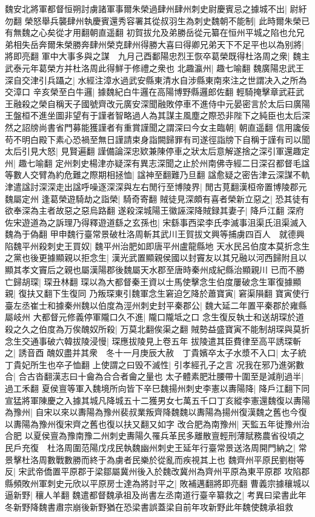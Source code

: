 魏安北將軍都督恒朔討虜諸軍事爾朱榮過肆州肆州刺史尉慶賓忌之據城不出|{
	尉紆勿翻}
榮怒舉兵襲肆州執慶賓還秀容署其從叔羽生為刺史魏朝不能制|{
	此時爾朱榮已有無魏之心矣從才用翻朝直遥翻}
初賀拔允及弟勝岳從元纂在恒州平城之陷也允兄弟相失岳奔爾朱榮勝奔肆州榮克肆州得勝大喜曰得卿兄弟天下不足平也以為别將|{
	將即亮翻}
軍中大事多與之謀　九月己酉鄱陽忠烈王恢卒葛榮既得杜洛周之衆|{
	魏主武泰元年葛榮方并杜洛周此得鮮于修禮之衆也}
北趣瀛州|{
	趣七喻翻}
魏廣陽忠武王深自交津引兵躡之|{
	水經注漳水過武安縣東清水自涉縣東南來注之世謂决入之所為交漳口}
辛亥榮至白牛邏|{
	據魏紀白牛邏在高陽博野縣邏郎佐翻}
輕騎掩擊章武莊武王融殺之榮自稱天子國號齊改元廣安深聞融敗停車不進侍中元晏密言於太后曰廣陽王盤桓不進坐圖非望有于謹者智略過人為其謀主風塵之際恐非陛下之純臣也太后深然之詔牓尚書省門募能獲謹者有重賞謹聞之謂深曰今女主臨朝|{
	朝直遥翻}
信用讒佞苟不明白殿下素心恐禍至無日謹請束身詣闕歸罪有司遂徑詣牓下自稱于謹有司以聞太后引見大怒|{
	見賢遍翻}
謹備論深忠欵兼陳停車之狀太后意解遂捨之深引軍還趣定州|{
	趣七喻翻}
定州刺史楊津亦疑深有異志深聞之止於州南佛寺經二日深召都督毛諡等數人交臂為約危難之際期相拯恤|{
	諡神至翻難乃旦翻}
諡愈疑之密告津云深謀不軌津遣諡討深深走出諡呼噪逐深深與左右閒行至博陵界|{
	閒古莧翻漢桓帝置博陵郡元魏屬定州}
逢葛榮遊騎劫之詣榮|{
	騎奇寄翻}
賊徒見深頗有喜者榮新立惡之|{
	恐其徒有欲奉深為主者故惡之惡烏路翻}
遂殺深城陽王徽誣深降賊録其妻子|{
	降戶江翻}
深府佐宋遊道為之訴理乃得釋遊道繇之玄孫也|{
	宋繇事西梁李氏李滅事沮渠氏沮渠滅入魏為于偽翻}
甲申魏行臺常景破杜洛周斬其武川王賀拔文興等捕虜四百人　就德興陷魏平州殺刺史王買奴|{
	魏平州治肥如即唐平州盧龍縣地}
天水民呂伯度本莫折念生之黨也後更據顯親以拒念生|{
	漢光武置顯親侯國以封竇友以其兄融以河西歸附且以顯其孝文竇后之親也屬漢陽郡後魏屬天水郡至唐時秦州成紀縣治顯親川}
已而不勝亡歸胡琛|{
	琛丑林翻}
琛以為大都督秦王資以士馬使擊念生伯度屢破念生軍復據顯親|{
	復扶又翻下生復同}
乃叛琛東引魏軍念生窘迫乞降於蕭寶寅|{
	窘渠隕翻}
寶寅使行臺左丞崔士和據秦州魏以伯度為涇州刺史封平秦郡公|{
	魏大延二年置平秦郡於雍縣屬岐州}
大都督元修義停軍隴口久不進|{
	隴口隴坻之口}
念生復反執士和送胡琛於道殺之久之伯度為万俟醜奴所殺|{
	万莫北翻俟渠之翻}
賊勢益盛寶寅不能制胡琛與莫折念生交通事破六韓拔陵浸慢|{
	琛應拔陵見上卷五年}
拔陵遣其臣費律至高平誘琛斬之|{
	誘音酉}
醜奴盡并其衆　冬十一月庚辰大赦　丁貴嬪卒太子水漿不入口|{
	太子統丁貴妃所生也卒子恤翻}
上使謂之曰毁不滅性|{
	引孝經孔子之言}
况我在邪乃進粥數合|{
	合古沓翻漢志曰十龠為合合者龠之量也}
太子體素肥壯腰帶十圍至是減削過半|{
	過工禾翻}
夏侯亶等軍入魏境所向皆下辛巳魏揚州刺史李憲以夀陽降|{
	降戶江翻下同}
宣猛將軍陳慶之入據其城凡降城五十二獲男女七萬五千口丁亥縱李憲還魏復以夀陽為豫州|{
	自宋以來以夀陽為豫州裴叔業叛齊降魏魏以夀陽為揚州復漢魏之舊也今復以夀陽為豫州復宋齊之舊也復以扶又翻又如字}
改合肥為南豫州|{
	天監五年徙豫州治合肥}
以夏侯亶為豫南豫二州刺史夀陽久罹兵革民多離散亶輕刑薄賦務農省役頃之民戶充復　杜洛周圍范陽戊戌民執魏幽州刺史王延年行臺常景送洛周開門納之|{
	常景擊杜洛周數戰數勝而終于為虜者民樂於從亂而疾視其上也}
魏齊州平原民劉樹等反|{
	宋武帝僑置平原郡于梁鄒屬冀州後入於魏改冀州為齊州平原為東平原郡}
攻陷郡縣頻敗州軍刺史元欣以平原房士達為將討平之|{
	敗補邁翻將即亮翻}
曹義宗據穰城以逼新野|{
	穰人羊翻}
魏遣都督魏承祖及尚書左丞南道行臺辛纂救之|{
	考異曰梁書此年冬新野降魏書肅宗崩後新野猶在恐梁書誤蓋梁自前年攻新野此年魏使魏承祖救}


